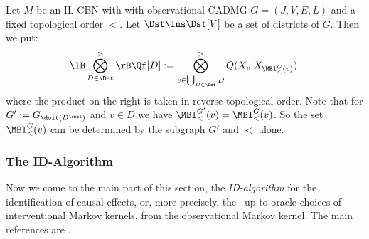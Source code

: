 \begin{Def}
    \label{not:Q-dist}
        Let $M$ be an IL-CBN with with observational CADMG $G=(J,V,E,L)$ and a fixed topological order $<$.
        Let  $\Dst \ins \Dst[V]$ be a set of districts of $G$. Then we put:
         \[ \lB \bigotimes_{D \in \Dst}^>\rB \Qf[D] := \bigotimes_{v \in \bigcup_{D \in \Dst} D}^> Q(X_v|X_{\MBl^G_<(v)}),  \]
         where the product on the right is taken in reverse topological order.
         Note that for $G':=G_{\doit(D^\cmpl)}$ and $v \in D$ we have $\MBl_<^{G'}(v)=\MBl_<^G(v)$. So the set $\MBl_<^G(v)$ 
         can be determined by the subgraph $G'$ and $<$ alone.
\end{Def}




\subsubsection{The ID-Algorithm}

Now we come to the main part of this section, the \emph{ID-algorithm} for the identification of causal effects, or, more precisely, the \trackability\ up to oracle choices of interventional Markov kernels, from the observational Markov kernel. 
The main references are \cite{Pearl09,GP95s,Tian2002,TP02s,Tian04s,SP06,HV06s,HV08s,RERS17,FM20}.

